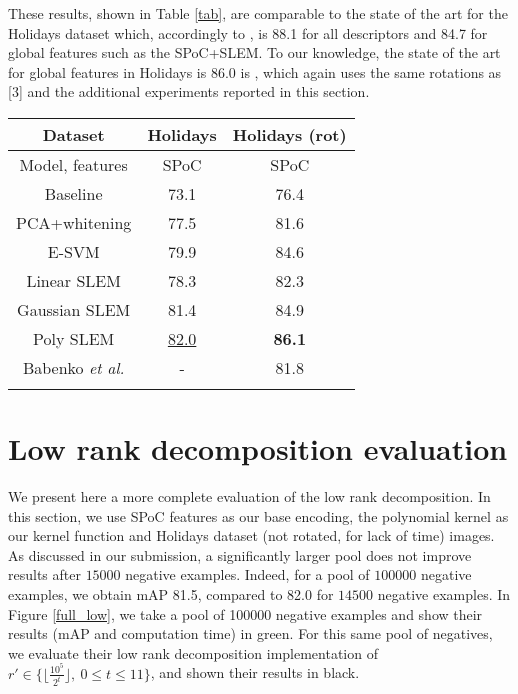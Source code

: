 \documentclass[runningheads]{llncs}
\begin{document}
These results, shown in Table \ref{tab}, are comparable to the state of the art for the Holidays dataset which, accordingly to \cite{holidaysSOTA}, is 88.1 for all descriptors and 84.7 for global features such as the SPoC+SLEM. To our knowledge, the state of the art for global features in Holidays is 86.0 is \cite{netVLAD}, which again uses the same rotations as [3] and the additional 
experiments reported in this section.

\begin{table*}[!h]
\begin{center}
\caption{Mean average precision results for INRIA Holidays, expressed as percentages. On the left, results for Holidays dataset as presented in our submission. On the right, results for Holidays dataset with images on their natural orientation.}
\setlength{\tabcolsep}{.2em}
\small
\begin{tabular}{c@{\hskip 1em}c@{\hskip 1em}c}
\toprule
Dataset & \textbf{Holidays} & \textbf{Holidays (rot)}\\
\midrule
Model, features  & SPoC & SPoC\\
\midrule
Baseline            & 73.1 & 76.4\\
PCA+whitening       & 77.5 & 81.6 \\
E-SVM               & 79.9 & 84.6 \\
Linear SLEM         & 78.3 & 82.3 \\
Gaussian SLEM       & 81.4 & 84.9 \\
Poly SLEM           & \underline{82.0} & \textbf{86.1} \\
Babenko \textit{et al.} \cite{babenko15} & - & 81.8\\
\hline
\label{tab}
\end{tabular}
\end{center}
\end{table*}

\section{Low rank decomposition evaluation}
We present here a more complete evaluation of the low rank decomposition. In this section, we use SPoC features as our base encoding, the polynomial kernel as our kernel function and Holidays dataset (not rotated, for lack of time) images.
As discussed in our submission, a significantly larger pool does not improve results after $15000$ negative examples. Indeed, for a pool of $100000$ negative examples, we obtain mAP 81.5, compared to 82.0 for $14500$ negative examples.
In Figure \ref{full_low}, we take a pool of 100000 negative examples and show their results (mAP and computation time) in green. For this same pool of negatives, we evaluate their low rank decomposition implementation of $r'\in\big\{ \lfloor \frac{10^5}{2^t}\rfloor, \ 0\le t\le 11 \big\}$, and shown their results in black.
\end{document}
